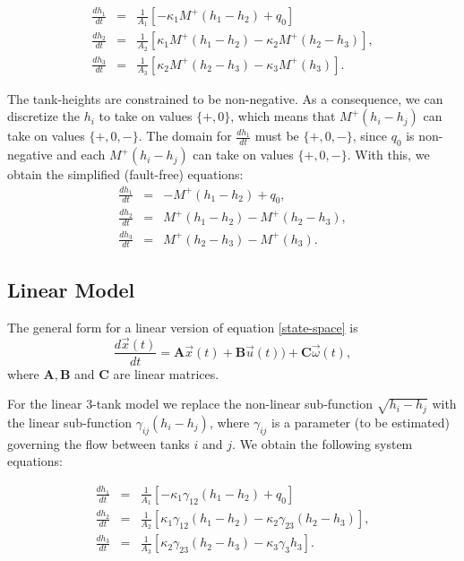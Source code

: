 \begin{eqnarray}
\frac{d h_1}{dt} & = & \frac{1}{A_1}\left[  - \kappa_1  M^+(h_1 - h_2) + q_0 \right]    \label{eq:qual-ode1} \\
\frac{d h_2}{dt} &  = & \frac{1}{A_2}\left[   \kappa_{1} M^+(h_{1}-h_{2}) - \kappa_2 M^+(h_2-h_3)\right],\\
\frac{d h_3}{dt} & = & \frac{1}{A_3}\left[   \kappa_{2} M^+(h_2-h_3) - \kappa_3 M^+(h_3)\right].
\end{eqnarray}

The tank-heights are constrained to be non-negative. As a consequence,
we can discretize the $h_i$ to take on values $\{+, 0\}$, which means that $M^+(h_i - h_j)$ can take on values $\{+, 0, -\}$. 
The domain for $\frac{d h_1}{dt}$ must be $\{+, 0, -\}$, since $q_0$ is non-negative and each  $M^+(h_i - h_j)$ can take on values $\{+, 0, -\}$.
With this, we obtain the simplified (fault-free) equations:
\begin{eqnarray}
\frac{d h_1}{dt} & = &   -  M^+(h_1 - h_2) + q_0,  \label{eq:qual-ode-simple} \\
\frac{d h_2}{dt} &  = &    M^+(h_{1}-h_{2}) - M^+(h_2-h_3),\\
\frac{d h_3}{dt} & = &    M^+(h_2-h_3) - M^+(h_3).
\end{eqnarray}


\subsection{Linear Model}

The general form for a linear version of  equation \ref{state-space} is
\begin{equation}\label{linear-state-space}
\frac{d \vec{x}(t)}{dt} = \mathbf{A} \vec{x}(t) + \mathbf{B} \vec{u}(t)) + \mathbf{C} \vec{\omega}(t),
\end{equation}
where $\mathbf{A}, \mathbf{B}$ and $\mathbf{C}$ are linear matrices.

For the linear 3-tank model we replace the non-linear sub-function
$ \sqrt{h_i - h_j}$ with the linear sub-function $\gamma_{ij} (h_i - h_j)$, where $\gamma_{ij}$ is a parameter (to be estimated) governing the flow between tanks $i$ and $j$. We obtain the following system equations:

\begin{eqnarray} \label{eq:linear-ode1}
\frac{d h_1}{dt} & = & \frac{1}{A_1}\left[  - \kappa_1 \gamma_{12} (h_1 - h_2) + q_0 \right]  \\%
\frac{d h_2}{dt} &  = & \frac{1}{A_2}\left[   \kappa_{1} \gamma_{12} (h_{1}-h_{2}) - \kappa_2 \gamma_{23} (h_2-h_3)\right],\\
\frac{d h_3}{dt} & = & \frac{1}{A_3}\left[   \kappa_{2} \gamma_{23} (h_2-h_3) - \kappa_3 \gamma_{3} h_3\right].
\end{eqnarray}


